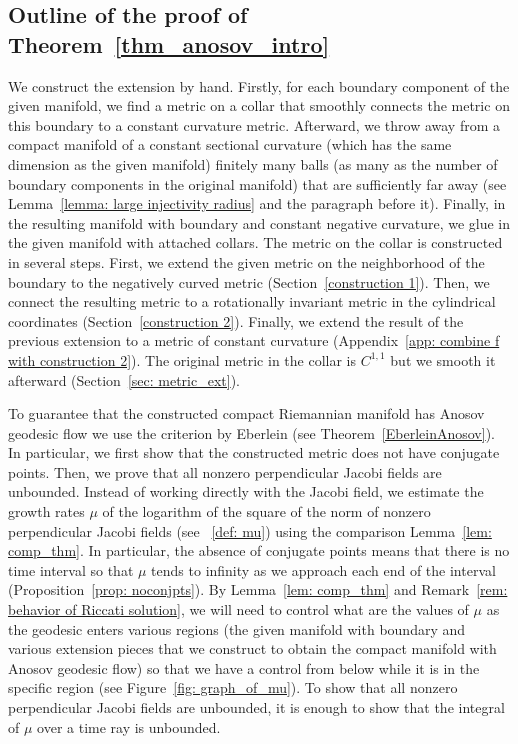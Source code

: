 \documentclass[JEP,XML,SOM,Unicode,NoFloatCountersInSection]{cedram}
\theoremstyle{definition}
\renewcommand{\>}{{\rangle}}
\newcommand{\<}{{\langle}}
\begin{document}
\subsection{Outline of the proof of Theorem~\ref{thm_anosov_intro}}\label{outline of the proof} We construct the extension by hand. Firstly, for each boundary component of the given manifold, we find a metric on a collar that smoothly connects the metric on this boundary to a constant curvature metric. Afterward, we throw away from a compact manifold of a constant sectional curvature (which has the same dimension as the given manifold) finitely many balls (as many as the number of boundary components in the original manifold) that are sufficiently far away (see Lemma~\ref{lemma: large injectivity radius} and the paragraph before it). Finally, in the resulting manifold with boundary and constant negative curvature, we glue in the given manifold with attached collars. The metric on the collar is constructed in several steps. First, we extend the given metric on the neighborhood of the boundary to the negatively curved metric (Section~\ref{construction 1}). Then, we connect the resulting metric to a rotationally invariant metric in the cylindrical coordinates (Section~\ref{construction 2}). Finally, we extend the result of the previous extension to a metric of constant curvature (Appendix~\ref{app: combine f with construction 2}). The original metric in the collar is $C^{1,1}$ but we smooth it afterward (Section~\ref{sec: metric_ext}).

To guarantee that the constructed compact Riemannian manifold has Anosov geodesic flow we use the criterion by Eberlein (see Theorem~\ref{EberleinAnosov}). In particular, we first show that the constructed metric does not have conjugate points. Then, we prove that all nonzero perpendicular Jacobi fields are unbounded. Instead of working directly with the Jacobi field, we estimate the growth rates $\mu$ of the logarithm of the square of the norm of nonzero perpendicular Jacobi fields (see ~\eqref{def: mu}) using the comparison Lemma~\ref{lem: comp_thm}. In particular, the absence of conjugate points means that there is no time interval so that $\mu$ tends to infinity as we approach each end of the interval (Proposition~\ref{prop: noconjpts}). By Lemma~\ref{lem: comp_thm} and Remark~\ref{rem: behavior of Riccati solution}, we will need to control what are the values of $\mu$ as the geodesic enters various regions (the given manifold with boundary and various extension pieces that we construct to obtain the compact manifold with Anosov geodesic flow) so that we have a control from below while it is in the specific region (see Figure~\ref{fig: graph_of_mu}). To show that all nonzero perpendicular Jacobi fields are unbounded, it is enough to show that the integral of $\mu$ over a time ray is unbounded.
\end{document}
